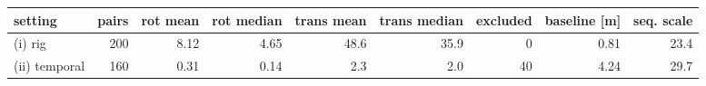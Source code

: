 \footnotesize\renewcommand{\arraystretch}{0.92}
\begin{tabular}{lrrrrrrrr}
\toprule
setting & pairs & rot mean & rot median & trans mean & trans median & excluded & baseline [m] & seq. scale \\
\midrule
(i) rig & 200 & 8.12 & 4.65 & 48.6 & 35.9 & 0 & 0.81 & 23.4 \\
(ii) temporal & 160 & 0.31 & 0.14 & 2.3 & 2.0 & 40 & 4.24 & 29.7 \\
\bottomrule
\end{tabular}
